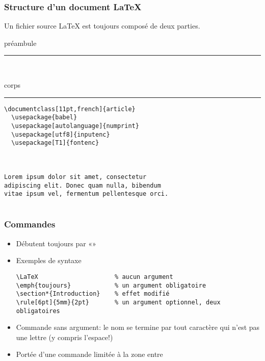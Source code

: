 \begin{frame}[fragile=singleslide]
  \frametitle{Structure d'un document {\LaTeX}}

  Un fichier source {\LaTeX} est toujours composé de deux parties.

  \begin{minipage}{0.2\linewidth}
    \begin{minipage}{\linewidth}
      \hfill préambule \quad
      \rule[-10mm]{1pt}{21mm}
    \end{minipage} \\[5mm]
    \begin{minipage}{\linewidth}
      \hfill corps \quad
      \rule[-15mm]{1pt}{30mm}
    \end{minipage}
  \end{minipage}
  \hfill
  \begin{minipage}{0.75\linewidth}
\begin{lstlisting}[emph={documentclass,begin,end,document}]
\documentclass[11pt,french]{article}
  \usepackage{babel}
  \usepackage[autolanguage]{numprint}
  \usepackage[utf8]{inputenc}
  \usepackage[T1]{fontenc}



Lorem ipsum dolor sit amet, consectetur
adipiscing elit. Donec quam nulla, bibendum
vitae ipsum vel, fermentum pellentesque orci.


\end{lstlisting}
  \end{minipage}
\end{frame}

\begin{frame}[fragile=singleslide]
  \frametitle{Commandes}
  \begin{itemize}
  \item Débutent toujours par «\bs»
  \item Exemples de syntaxe
\begin{lstlisting}
\LaTeX                     % aucun argument
\emph{toujours}            % un argument obligatoire
\section*{Introduction}    % effet modifié
\rule[6pt]{5mm}{2pt}       % un argument optionnel, deux obligatoires
\end{lstlisting}
   \item Commande sans argument: le nom se termine par tout
    caractère qui n'est \alert{pas une lettre} (y compris l'espace!)
  \item Portée d'une commande limitée à la zone entre \code{\{~\}}
  \end{itemize}
\end{frame}

